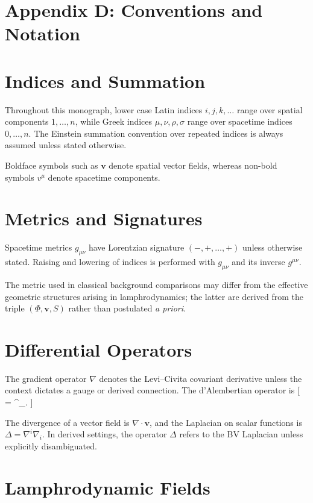 \section*{Appendix D: Conventions and Notation}

\section{Indices and Summation}

Throughout this monograph, lower case Latin indices $i,j,k,\dots$ range over spatial components $1,\dots,n$, while Greek indices $\mu,\nu,\rho,\sigma$ range over spacetime indices $0,\dots,n$.  The Einstein summation convention over repeated indices is always assumed unless stated otherwise.

Boldface symbols such as $\mathbf v$ denote spatial vector fields, whereas non-bold symbols $v^\mu$ denote spacetime components.

\section{Metrics and Signatures}

Spacetime metrics $g_{\mu\nu}$ have Lorentzian signature $(-,+,\ldots,+)$ unless otherwise stated.  Raising and lowering of indices is performed with $g_{\mu\nu}$ and its inverse $g^{\mu\nu}$.

The metric used in classical background comparisons may differ from the effective geometric structures arising in lamphrodynamics; the latter are derived from the triple $(\Phi,\mathbf v,S)$ rather than postulated \emph{a priori}.

\section{Differential Operators}

The gradient operator $\nabla$ denotes the Levi--Civita covariant derivative unless the context dictates a gauge or derived connection. The d'Alembertian operator is
[
\square = \nabla^\mu\nabla_\mu.
]

The divergence of a vector field is $\nabla\cdot\mathbf v$, and the Laplacian on scalar functions is $\Delta=\nabla^i\nabla_i$.  In derived settings, the operator $\Delta$ refers to the BV Laplacian unless explicitly disambiguated.

\section{Lamphrodynamic Fields}

